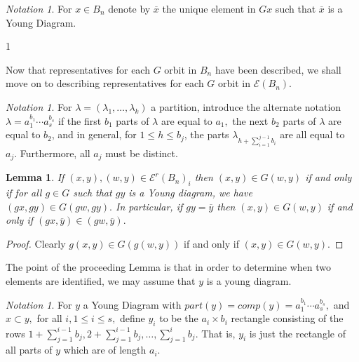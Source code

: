 \documentclass[10 pt]{amsart}
\theoremstyle{plain}
\newtheorem{lem}[thm]{Lemma}
\theoremstyle{definition}
\theoremstyle{remark}
\newtheorem{note}[thm]{Notation}
\numberwithin{equation}{section}
\begin{document}
\begin{note}
For $x \in B_n$ denote by $\overline{x}$ the unique element in $Gx$ such that $\overline{x}$ is a Young Diagram.
\end{note}1

Now that representatives for each $G$ orbit in $B_n$ have been described, we shall move on to describing representatives for each $G$ orbit in $\mathcal E(B_n).$

\begin{note}
For $\lambda = (\lambda_1,\ldots, \lambda_k)$ a partition, introduce the alternate notation $\lambda = a_1^{b_1} \cdots a_s^{b_s}$ if the first $b_1$ parts of $\lambda$ are equal to $a_1,$ the next $b_2$ parts of $\lambda$ are equal to $b_2$, and in general, for $1 \leq h\leq b_j$, the parts $ \lambda_{h+\sum_{i=1}^{j-1} b_i}$ are all equal to $a_j.$ Furthermore, all $a_j$ must be distinct.
\end{note}

\begin{lem}
\label{lem:young_diag_reduction}
If $(x, y), (w, y) \in\mathcal E^r(B_n)_i$ then $(x, y) \in G(w, y)$ if and only if for all $g \in G$ such that $gy$ is a Young diagram, we have $(gx, gy) \in G(gw, gy).$ In particular, if $gy = \overline y$ then $(x, y) \in G(w, y)$ if and only if $(gx, \overline y) \in (gw, \overline y).$
\end{lem}
\begin{proof}
Clearly $g(x, y) \in G(g(w, y))$ if and only if $(x, y) \in G(w, y).$
\end{proof}

The point of the proceeding Lemma is that in order to determine when two elements are identified, we may assume that $y$ is a young diagram.

\begin{note}
For $y$ a Young Diagram with $part(y) = comp(y) = a_1^{b_1}\cdots a_s^{b_s},$ and $x \subset y,$ for all $i,1 \leq i \leq s,$ define $y_i$ to be the $a_i \times b_i$ rectangle consisting of the rows $1+\sum_{j = 1}^{i-1} b_j,2+\sum_{j = 1}^{i-1} b_j,\ldots, \sum_{j = 1}^{i} b_j.$ That is, $y_i$ is just the rectangle of all parts of $y$ which are of length $a_i.$
\end{note}
\end{document}
